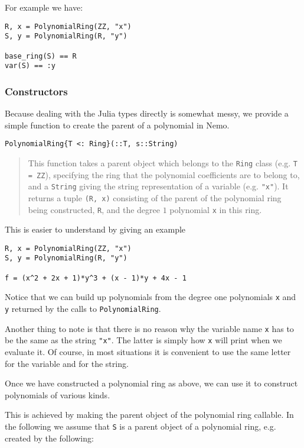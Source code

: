 \documentclass[a4paper,10pt]{article}
\newcommand{\code}{\lstinline}
\newcommand{\desc}[1]{\vspace{-3mm}\begin{quote}#1\end{quote}}
\begin{document}
For example we have:

\begin{lstlisting}
R, x = PolynomialRing(ZZ, "x")
S, y = PolynomialRing(R, "y")

base_ring(S) == R
var(S) == :y
\end{lstlisting}

\subsubsection{Constructors}

Because dealing with the Julia types directly is somewhat messy, we provide a simple
function to create the parent of a polynomial in Nemo.

\begin{lstlisting}
PolynomialRing{T <: Ring}(::T, s::String)
\end{lstlisting}

\desc{This function takes a parent object which belongs to the \code|Ring| class 
(e.g. \code|T = ZZ|), specifying the ring that the polynomial coefficients are to 
belong to, and a \code{String} giving the string representation of a variable (e.g. 
\code|"x"|). It returns a tuple \code|(R, x)| consisting of the parent of the polynomial
ring being constructed, \code|R|, and the degree $1$ polynomial \code|x| in this ring.}

This is easier to understand by giving an example

\begin{lstlisting}
R, x = PolynomialRing(ZZ, "x")
S, y = PolynomialRing(R, "y")

f = (x^2 + 2x + 1)*y^3 + (x - 1)*y + 4x - 1
\end{lstlisting}

Notice that we can build up polynomials from the degree one polynomials \code{x} and
\code{y} returned by the calls to \code{PolynomialRing}. 

Another thing to note is that there is no reason why the variable name \code{x} has
to be the same as the string \code{"x"}. The latter is simply how \code{x} will print
when we evaluate it. Of course, in most situations it is convenient to use the same 
letter for the variable and for the string.

Once we have constructed a polynomial ring as above, we can use it to construct
polynomials of various kinds.

This is achieved by making the parent object of the polynomial ring callable. In the
following we assume that \code{S} is a parent object of a polynomial ring, e.g.
created by the following:
\end{document}
